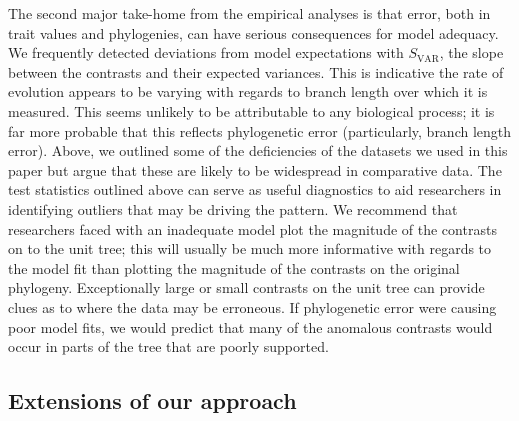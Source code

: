 The second major take-home from the empirical analyses is that error, both in trait values and phylogenies, can have serious consequences for model adequacy. We frequently detected deviations from model expectations with $S_{\text{VAR}}$, the slope between the contrasts and their expected variances. This is indicative the rate of evolution appears to be varying with regards to branch length over which it is measured. This seems unlikely to be attributable to any biological process; it is far more probable that this reflects phylogenetic error (particularly, branch length error). Above, we outlined some of the deficiencies of the datasets we used in this paper but argue that these are likely to be widespread in comparative data. The test statistics outlined above can serve as useful diagnostics to aid researchers in identifying outliers that may be driving the pattern. We recommend that researchers faced with an inadequate model plot the magnitude of the contrasts on to the unit tree; this will usually be much more informative with regards to the model fit than plotting the magnitude of the contrasts on the original phylogeny. Exceptionally large or small contrasts on the unit tree can provide clues as to where the data may be erroneous. If phylogenetic error were causing poor model fits, we would predict that many of the anomalous contrasts would occur in parts of the tree that are poorly supported.
 
\subsection{Extensions of our approach}

